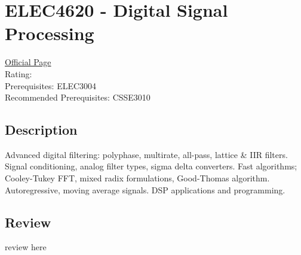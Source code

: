 \hypertarget{ELEC4620}{\section{ELEC4620 - Digital Signal Processing}}

\large
\textcolor{turbo_purple}{\href{https://my.uq.edu.au/programs-courses/course.html?course_code=ELEC4620}{Official Page}} \\
Rating: \cstar\cstar\cstar\cstar\ostar \\
Prerequisites: ELEC3004 \\
Recommended Prerequisites: CSSE3010

\normalsize
\subsection*{Description}
Advanced digital filtering: polyphase, multirate, all-pass, lattice \& IIR filters.
Signal conditioning, analog filter types, sigma delta converters.
Fast algorithms; Cooley-Tukey FFT, mixed radix formulations, Good-Thomas algorithm.
Autoregressive, moving average signals. DSP applications and programming.

\subsection*{Review}
review here
